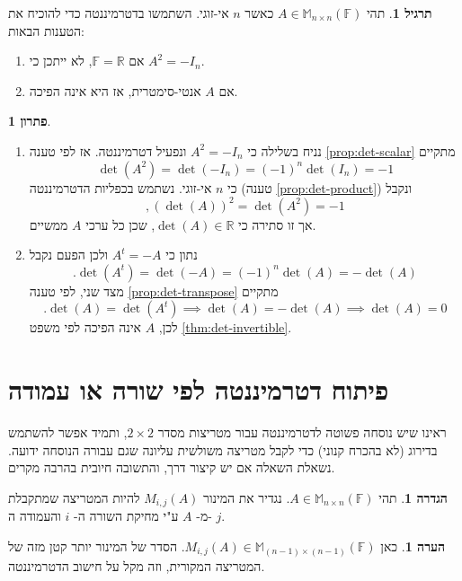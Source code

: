 \documentclass[12pt]{report}
\theoremstyle{plain}
\theoremstyle{definition}
\newtheorem{definition}[theorem]{הגדרה}
\newtheorem{exercise}{תרגיל}[chapter]
\newtheorem{remark}{הערה}[chapter]
\newtheorem*{solution}{פתרון}
\newcommand{\R}{\mathbb{R}}
\newcommand{\F}{\mathbb{F}}
\newcommand{\M}{\mathbb{M}}
\newcommand{\0}{\mathbf{0}}
\begin{document}
\begin{exercise}
תהי
$A\in\M_{n\times n}(\F)$
כאשר 
$n$
אי-זוגי. השתמשו בדטרמיננטה כדי להוכיח את הטענות הבאות:

\begin{enumerate}[label=\alph*.]
\item 
אם 
$\F=\R$,
לא ייתכן כי
$A^2=-I_n$.

\item 
אם 
$A$
אנטי-סימטרית, אז היא אינה הפיכה.



\end{enumerate}
\end{exercise}

\begin{solution}\
\begin{enumerate}[label=\alph*.]
\item
נניח בשלילה כי 
$A^2=-I_n$
ונפעיל דטרמיננטה. אז לפי טענה 
\ref{prop:det-scalar}
מתקיים
$$
\det(A^2)=\det(-I_n)=(-1)^n\det(I_n)=-1
$$
כי 
$n$
אי-זוגי.
נשתמש בכפליות הדטרמיננטה (טענה
\ref{prop:det-product})
ונקבל
$$
,(\det(A))^2=\det(A^2)=-1
$$
אך זו סתירה כי 
$\det(A)\in\R$,
שכן כל ערכי 
$A$
ממשיים.


\item 
נתון כי
$A^t=-A$
ולכן הפעם נקבל
$$
.\det(A^t)=\det(-A)=(-1)^n\det(A)=-\det(A)
$$
מצד שני, לפי טענה
\ref{prop:det-transpose}
מתקיים 
$$
.\det(A)=\det(A^t) \implies \det(A)=-\det(A) \implies \det(A)=0
$$
לכן, 
$A$
אינה הפיכה לפי משפט
\ref{thm:det-invertible}.


\end{enumerate}
\end{solution}

\section{פיתוח דטרמיננטה לפי שורה או עמודה}
ראינו שיש נוסחה פשוטה לדטרמיננטה עבור מטריצות מסדר
$2\times 2$,
ותמיד אפשר להשתמש בדירוג (לא בהכרח קנוני) כדי לקבל מטריצה משולשית עליונה שגם עבורה הנוסחה ידועה. נשאלת השאלה אם יש קיצור דרך, והתשובה חיובית בהרבה מקרים.

\begin{definition}
תהי
$A\in\M_{n\times n}(\F)$.
נגדיר את המינור
$M_{i,j}(A)$
להיות המטריצה שמתקבלת מ-
$A$
ע"י מחיקת השורה ה-
$i$
והעמודה ה-
$j$.
\end{definition}

\begin{remark}
כאן
$M_{i,j}(A)\in\M_{(n-1)\times(n-1)}(\F)$.
הסדר של המינור יותר קטן מזה של המטריצה המקורית, וזה מקל על חישוב הדטרמיננטה.
\end{remark}
\end{document}
